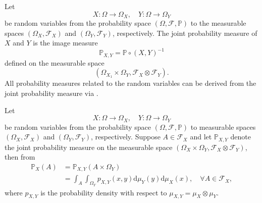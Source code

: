 \begin{definition}
	\label{def:joint}
	Let
	\begin{equation}
		X\colon \Omega \to \Omega_X, \quad Y\colon \Omega \to \Omega_Y
	\end{equation}
	be random variables from the probability space $(\Omega, \mathcal{F}, \mathbb{P})$ to the measurable spaces $(\Omega_X, \mathcal{F}_X)$ and $(\Omega_Y, \mathcal{F}_Y)$, respectively.	The joint probability measure of $X$ and $Y$ is the image measure
	\begin{equation}
		\mathbb{P}_{X,Y} = \mathbb{P}\circ(X,Y)^{-1}
	\end{equation}
	defined on the measurable space 
	\begin{equation}
		(\Omega_{X_1}\times\Omega_{Y}, \mathcal{F}_{X}\otimes\mathcal{F}_{Y}).
	\end{equation}	
	All probability measures related to the random variables can be derived from the joint probability measure via .
\end{definition}

\begin{remark}
	\label{remark:marginalization}
	Let
	\begin{equation}
		X\colon \Omega \to \Omega_X, \quad Y\colon \Omega \to \Omega_Y
	\end{equation}
	be random variables from the probability space $(\Omega, \mathcal{F}, \mathbb{P})$ to measurable spaces $(\Omega_X, \mathcal{F}_X)$ and $(\Omega_Y, \mathcal{F}_Y)$, respectively. Suppose $A\in \mathcal{F}_X$ and let $\mathbb{P}_{X,Y}$ denote the joint probability measure on the measurable space $(\Omega_{X}\times\Omega_{Y}, \mathcal{F}_{X}\otimes\mathcal{F}_{Y})$, then from 
	\begin{equation}
			\begin{split}
				\mathbb{P}_X(A) &= \mathbb{P}_{X,Y}(A \times \Omega_Y)\\
				& = \int_{A}\int_{\Omega_Y}p_{X,Y}(x,y)\mathrm{d}\mu_Y(y)\mathrm{d}\mu_X(x), \quad \forall A \in \mathcal{F}_X,
			\end{split}
	\end{equation}
	where $p_{X,Y}$ is the probability density with respect to $\mu_{X,Y} = \mu_X \otimes \mu_Y$.
\end{remark}


